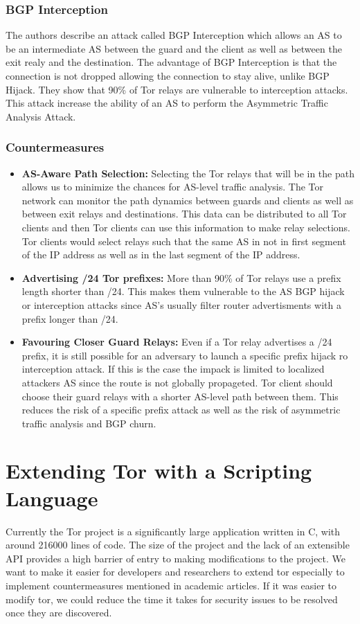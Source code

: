 \documentclass[9pt,technote]{IEEEtran}
\begin{document}
\subsubsection{BGP Interception}
The authors describe an attack called BGP Interception which allows an AS to be
an intermediate AS between the guard and the client as well as between the exit
realy and the destination. The advantage of BGP Interception is that the
connection is not dropped allowing the connection to stay alive, unlike BGP
Hijack. They show that 90\% of Tor relays are vulnerable to interception
attacks. This attack increase the ability of an AS to perform the Asymmetric
Traffic Analysis Attack. 
\subsubsection{Countermeasures}
\begin{itemize}
\item \textbf{AS-Aware Path Selection:} Selecting the Tor relays that will be in
	the path allows us to minimize the chances for AS-level traffic
	analysis. The Tor network can monitor the path dynamics between guards
	and clients as well as between exit relays and destinations. This data
	can be distributed to all Tor clients and then Tor clients can use this
	information to make relay selections. Tor clients would select relays
	such that the same AS in not in first segment of the IP address as well
	as in the last segment of the IP address.
\item \textbf{Advertising /24 Tor prefixes:} More than 90\% of Tor relays use a
	prefix length shorter than /24. This makes them vulnerable to the AS BGP
	hijack or interception attacks since AS's usually filter router
	advertisments with a prefix longer than /24.
\item \textbf{Favouring Closer Guard Relays:} Even if a Tor relay advertises a
	/24 prefix, it is still possible for an adversary to launch a specific
	prefix hijack ro interception attack. If this is the case the impack is
	limited to localized attackers AS since the route is not globally
	propageted. Tor client should choose their guard relays with a shorter
	AS-level path between them. This reduces the risk of a specific prefix
	attack as well as the risk of asymmetric traffic analysis and BGP churn.
\end{itemize}


\section{Extending Tor with a Scripting Language}
Currently the Tor project is a significantly large application written in C,
with around 216000 lines of code. The size of the project and the lack of an
extensible API provides a high barrier of entry to making modifications to the
project. We want to make it easier for developers and researchers to extend tor
especially to implement countermeasures mentioned in academic articles. If it
was easier to modify tor, we could reduce the time it takes for security issues
to be resolved once they are discovered.
\end{document}
